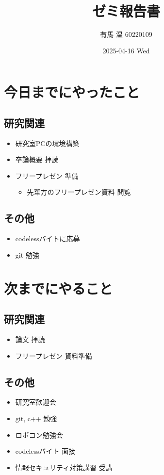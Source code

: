 \documentclass[uplatex, onecolumn, 10pt]{jsarticle}
\begin{document}
\title{\vspace{-40mm}\bf{\LARGE{ゼミ報告書}}}
\author{\vspace{-40mm}有馬 温 60220109}
\date{2025-04-16 Wed}
\maketitle


\section{今日までにやったこと}

\subsection*{研究関連} 
\begin{itemize}
	\item 研究室PCの環境構築
	\item 卒論概要 拝読
	\item フリープレゼン 準備
		\begin{itemize}
			\item 先輩方のフリープレゼン資料 閲覧
		\end{itemize}
\end{itemize}

\subsection*{その他}
\begin{itemize}
	\item codelessバイトに応募
	\item git 勉強
\end{itemize}


\section{次までにやること}

\subsection*{研究関連}
\begin{itemize}
	\item 論文 拝読
	\item フリープレゼン 資料準備
\end{itemize}

\subsection*{その他}
\begin{itemize}
    \item 研究室歓迎会
    \item git, c++ 勉強
    \item ロボコン勉強会
    \item codelessバイト 面接
    \item 情報セキュリティ対策講習 受講
\end{itemize}
\end{document}
